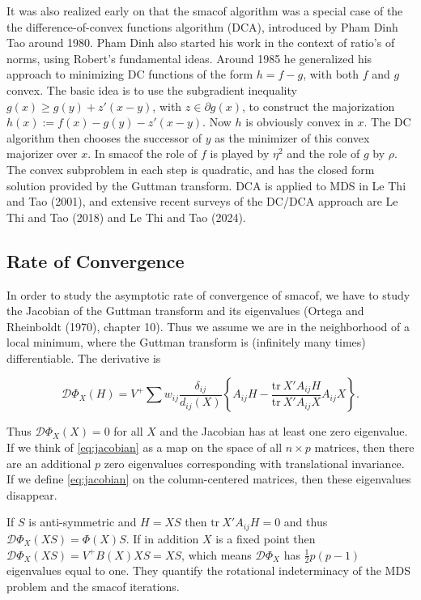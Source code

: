 \documentclass[
  12pt,
]{article}
\begin{document}
It was also realized early on that the smacof algorithm was a special case of the
the difference-of-convex functions algorithm (DCA), introduced by Pham Dinh Tao around
1980. Pham Dinh also started his work in the context of ratio's of norms, using
Robert's fundamental ideas. Around 1985 he generalized his approach to minimizing
DC functions of the form \(h=f-g\), with both \(f\) and \(g\) convex. The basic idea
is to use the subgradient inequality \(g(x)\geq g(y)+z'(x-y)\), with \(z\in\partial g(x)\),
to construct the majorization \(h(x):=f(x)-g(y)-z'(x-y)\). Now \(h\) is obviously convex in \(x\). The DC algorithm then chooses the successor of \(y\) as the minimizer of this convex majorizer over \(x\). In smacof the role of \(f\) is played by \(\eta^2\) and the role of \(g\) by \(\rho\). The convex subproblem in each step is quadratic, and has the closed form solution provided by the Guttman transform. DCA is applied to MDS in Le Thi and Tao (2001), and extensive recent surveys of the DC/DCA approach are Le Thi and Tao (2018) and Le Thi and Tao (2024).

\subsection{Rate of Convergence}\label{rate-of-convergence}

In order to study the asymptotic rate of convergence of smacof, we have to
study the Jacobian of the Guttman transform and its eigenvalues (Ortega and Rheinboldt (1970), chapter 10). Thus we assume we are in the neighborhood of a local minimum,
where the Guttman transform is (infinitely many times) differentiable. The
derivative is

\begin{equation}
\mathcal{D}\Phi_X(H)=V^+\sum w_{ij}\frac{\delta_{ij}}{d_{ij}(X)}\left\{A_{ij}H-\frac{\text{tr}\ X'A_{ij}H}{ \text{tr}\ X'A_{ij}X}A_{ij}X\right\}.
\label{eq:jacobian}
\end{equation}

Thus \(\mathcal{D}\Phi_X(X)=0\) for all \(X\) and the Jacobian has at least one
zero eigenvalue. If we think of \eqref{eq:jacobian} as a map on the space
of all \(n\times p\) matrices, then there are an additional \(p\) zero eigenvalues
corresponding with translational invariance. If we define \eqref{eq:jacobian}
on the column-centered matrices, then these eigenvalues disappear.

If \(S\) is anti-symmetric and
\(H=XS\) then \(\text{tr}\ X'A_{ij}H=0\) and thus \(\mathcal{D}\Phi_X(XS)=\Phi(X)S\).
If in addition \(X\) is a fixed point then \(\mathcal{D}\Phi_X(XS)=V^+B(X)XS=XS\),
which means \(\mathcal{D}\Phi_X\) has \(\frac12p(p-1)\) eigenvalues equal to one.
They quantify the rotational indeterminacy of the MDS problem and the
smacof iterations.
\end{document}
